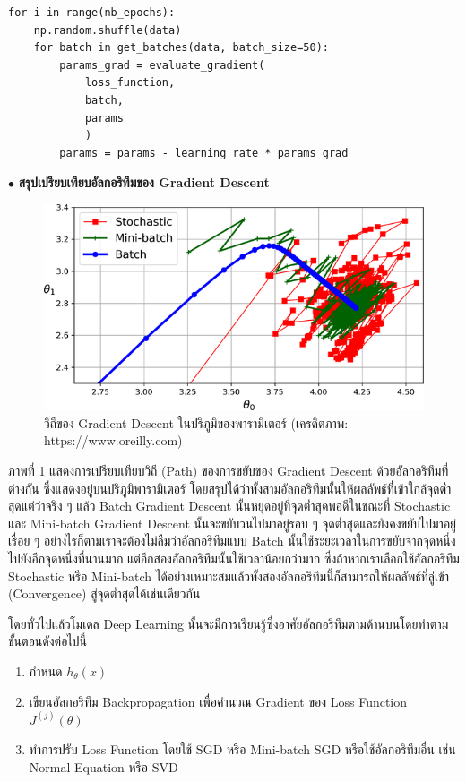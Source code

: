 \begin{lstlisting}[style=MyPython]
for i in range(nb_epochs):
    np.random.shuffle(data)
    for batch in get_batches(data, batch_size=50):
        params_grad = evaluate_gradient(
            loss_function, 
            batch, 
            params
            )
        params = params - learning_rate * params_grad
\end{lstlisting}

\vspace{1em}
\noindent $\bullet$ \textbf{สรุปเปรียบเทียบอัลกอริทึมของ Gradient Descent}

\begin{figure}[H]
    \centering
    \includegraphics[width=0.8\linewidth]{fig/gradient_descent_path.png}
    \caption{วิถีของ Gradient Descent ในปริภูมิของพารามิเตอร์ (เครดิตภาพ: https://www.oreilly.com)}
    \label{fig:gradient_descent_path}
\end{figure}

ภาพที่ \ref{fig:gradient_descent_path} แสดงการเปรียบเทียบวิถี (Path) ของการขยับของ Gradient Descent ด้วยอัลกอริทึมที่ต่างกัน
ซึ่งแสดงอยู่บนปริภูมิพารามิเตอร์ โดยสรุปได้ว่าทั้งสามอัลกอริทึมนั้นให้ผลลัพธ์ที่เข้าใกล้จุดต่ำสุดแต่ว่าจริง ๆ แล้ว Batch Gradient Descent
นั้นหยุดอยู่ที่จุดต่ำสุดพอดีในขณะที่ Stochastic และ Mini-batch Gradient Descent นั้นจะขยับวนไปมาอยู่รอบ ๆ จุดต่ำสุดและยังคงขยับไปมาอยู่เรื่อย ๆ อย่างไรก็ตามเราจะต้องไม่ลืมว่าอัลกอริทึมแบบ Batch นั้นใช้ระยะเวลาในการขยับจากจุดหนึ่งไปยังอีกจุดหนึ่งที่นานมาก แต่อีกสองอัลกอริทึมนั้นใช้เวลาน้อยกว่ามาก ซึ่งถ้าหากเราเลือกใช้อัลกอริทึม Stochastic หรือ Mini-batch ได้อย่างเหมาะสมแล้วทั้งสองอัลกอริทึมนี้ก็สามารถให้ผลลัพธ์ที่ลู่เข้า (Convergence) สู่จุดต่ำสุดได้เช่นเดียวกัน

โดยทั่วไปแล้วโมเดล Deep Learning นั้นจะมีการเรียนรู้ซึ่งอาศัยอัลกอริทึมตามด้านบนโดยทำตามขั้นตอนดังต่อไปนี้
%
\begin{enumerate}[topsep=0pt,noitemsep]\setlength\itemsep{0.5em}
    \item กำหนด $h_\theta(x)$

    \item เขียนอัลกอริทึม Backpropagation เพื่อคำนวณ Gradient ของ Loss Function $J^{(j)}(\theta)$

    \item ทำการปรับ Loss Function โดยใช้ SGD หรือ Mini-batch SGD หรือใช้อัลกอริทึมอื่น เช่น Normal Equation หรือ SVD
\end{enumerate}


